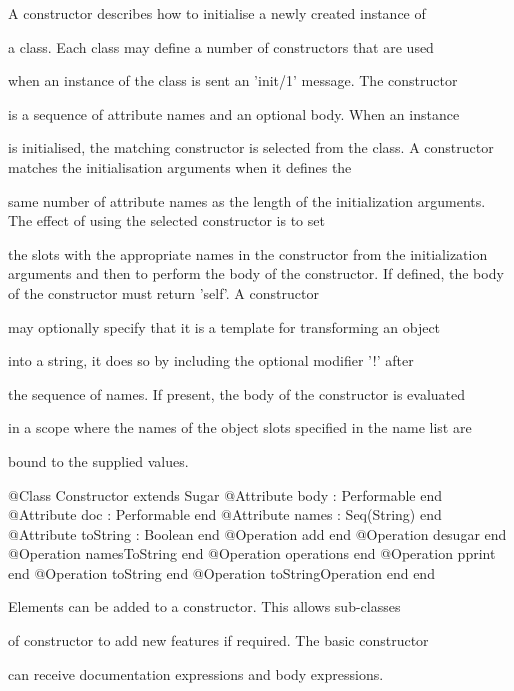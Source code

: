       A constructor describes how to initialise a newly created instance of

      a class. Each class may define a number of constructors that are used

      when an instance of the class is sent an 'init/1' message. The constructor

      is a sequence of attribute names and an optional body. When an instance

      is initialised, the matching constructor is selected from the class.
      A constructor matches the initialisation arguments when it defines the

      same number of attribute names as the length of the initialization 
      arguments. The effect of using the selected constructor is to set

      the slots with the appropriate names in the constructor from the 
      initialization arguments and then to perform the body of the constructor.
      If defined, the body of the constructor must return 'self'. A constructor

      may optionally specify that it is a template for transforming an object

      into a string, it does so by including the optional modifier '!' after

      the sequence of names. If present, the body of the constructor is evaluated

      in a scope where the names of the object slots specified in the name list are

      bound to the supplied values.
\begin{Interface}
@Class Constructor extends Sugar
  @Attribute body : Performable end
  @Attribute doc : Performable end
  @Attribute names : Seq(String) end
  @Attribute toString : Boolean end
  @Operation add end
  @Operation desugar end
  @Operation namesToString end
  @Operation operations end
  @Operation pprint end
  @Operation toString end
  @Operation toStringOperation end
end
\end{Interface}

        Elements can be added to a constructor. This allows sub-classes

        of constructor to add new features if required. The basic constructor

        can receive documentation expressions and body expressions.

